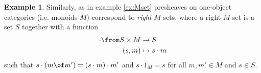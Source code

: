 \documentclass{article}
\theoremstyle{definition}
\newtheorem{example}{Example}
\begin{document}
\begin{example}
  Similarly, as in example \ref{ex:Mset} presheaves on one-object categories (i.e. monoids $M$) correspond to \emph{right} $M$-sets, where a right $M$-set is a set $S$ together with a function
  \begin{align*}
    \cdot\from S\times M&\to S\\
    (s,m)&\mapsto s\cdot m
  \end{align*}
  such that $s\cdot (m\of m')=(s\cdot m)\cdot m'$ and $s\cdot 1_M=s$ for all $m,m'\in M$ and $s\in S$.
\end{example}
\end{document}
